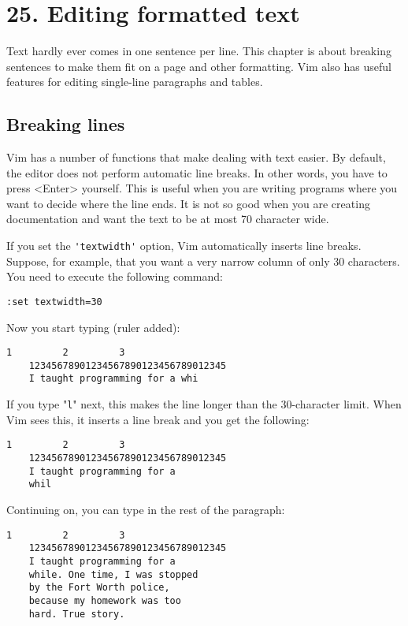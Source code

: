\section{25. Editing formatted text}
Text hardly ever comes in one sentence per line.
This chapter is about breaking sentences to make them fit on a page and other formatting.
Vim also has useful features for editing single-line paragraphs and tables.
\subsection{Breaking lines}
Vim has a number of functions that make dealing with text easier.
By default, the editor does not perform automatic line breaks.
In other words, you have to press <Enter> yourself.
This is useful when you are writing programs where you want to decide where the line ends.
It is not so good when you are creating documentation and want the text to be at most 70 character wide.

If you set the \verb!'textwidth'! option, Vim automatically inserts line breaks.
Suppose, for example, that you want a very narrow column of only 30 characters.
You need to execute the following command:

\begin{Verbatim}[samepage=true]
 :set textwidth=30
\end{Verbatim}

Now you start typing (ruler added):

\begin{Verbatim}[samepage=true]
             1         2         3
    12345678901234567890123456789012345
    I taught programming for a whi 
\end{Verbatim}

If you type "\verb!l!" next, this makes the line longer than the 30-character limit.
When Vim sees this, it inserts a line break and you get the following:

\begin{Verbatim}[samepage=true]
             1         2         3
    12345678901234567890123456789012345
    I taught programming for a 
    whil 
\end{Verbatim}

Continuing on, you can type in the rest of the paragraph:

\begin{Verbatim}[samepage=true]
             1         2         3
    12345678901234567890123456789012345
    I taught programming for a 
    while. One time, I was stopped 
    by the Fort Worth police, 
    because my homework was too 
    hard. True story. 
\end{Verbatim}

